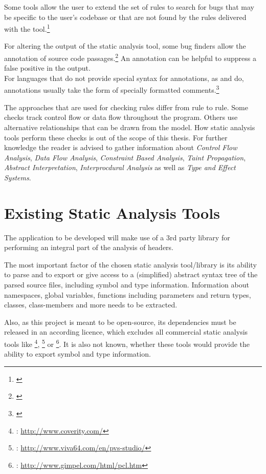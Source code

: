 Some tools allow the user to extend the set of rules to search for bugs that may be specific to the user's codebase or that are not found by the rules delivered with the tool.\footnote{\citep[97]{SecureProgramming}}

For altering the output of the static analysis tool, some bug finders allow the annotation of source code passages.\footnote{\citep[99]{SecureProgramming}} An annotation can be helpful to suppress a false positive in the output.
\\For languages that do not provide special syntax for annotations, as  and  do, annotations usually
take the form of specially formatted comments.\footnote{\citep[99]{SecureProgramming}}

The approaches that are used for checking rules differ from rule to rule. Some checks track control flow or data flow throughout the program. Others use alternative relationships that can be drawn from the model. How static analysis tools perform these checks is out of the scope of this thesis. For further knowledge the reader is advised to gather information about \textit{Control Flow Analysis}, \textit{Data Flow Analysis}, \textit{Constraint Based Analysis}, \textit{Taint Propagation}, \textit{Abstract Interpretation}, \textit{Interprocdural Analysis }as well as \textit{Type and Effect Systems}. 

\section{Existing Static Analysis Tools}

The application to be developed will make use of a 3rd party library for performing an integral part of the analysis of  headers. 

The most important factor of the chosen static analysis tool/library is its ability to parse  and to export or give access to a (simplified) abstract syntax tree of the parsed source files, including symbol and type information. Information about namespaces, global variables, functions including parameters and return types, classes, class-members and more needs to be extracted.

Also, as this project is meant to be open-source, its dependencies must be released in an according licence, which excludes all commercial static analysis tools like \footnote{: \url{http://www.coverity.com/}}, \footnote{: \url{http://www.viva64.com/en/pvs-studio/}} or \footnote{: \url{http://www.gimpel.com/html/pcl.htm}}. It is also not known, whether these tools would provide the ability to export symbol and type information.

